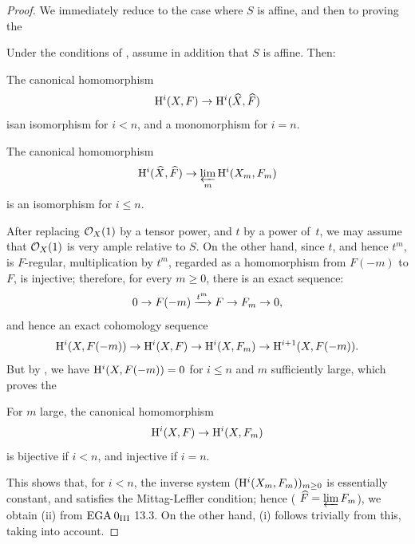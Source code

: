 \begin{proof}
We immediately reduce to the case where $S$ is affine, and then to proving the

\begin{corollaire} \label{XII.2.2}
Under the conditions of , assume in addition that $S$ is affine. Then:
\begin{enumeratei}
\item
The canonical homomorphism
\[
\mathrm H^i(X, F) \to \mathrm H^i(\widehat{X}, \widehat{F})
\]
is\pageoriginale an isomorphism for $i<n$, and a monomorphism for $i=n$.
\item
The canonical homomorphism
\[
\mathrm H^i(\widehat{X}, \widehat{F}) \to \varprojlim_m \mathrm H^i(X_m, F_m)
\]
is an isomorphism for $i\leq n$.
\end{enumeratei}
\end{corollaire}

After replacing $\mathcal O_X(1)$ by a tensor power, and $t$ by a power of~$t$, we may assume that $\mathcal O_X(1)$ is very ample relative to $S$. On the other hand, since $t$, and hence $t^m$, is $F$-regular, multiplication by $t^m$, regarded as a homomorphism from $F(-m)$ to $F$, is injective; therefore, for every $m\geq 0$, there is an exact sequence:
\steco
\begin{equation} \label{eq:XII.14}
0\to F(-m) \xrightarrow{t^m} F \to F_m \to0,
\end{equation}
and hence an exact cohomology sequence
\[
\mathrm H^i(X, F(-m)) \to \mathrm H^i(X, F) \to \mathrm H^i(X, F_m) \to \mathrm H^{i+1}(X, F(-m)).
\]
But by , we have $\mathrm H^i(X, F(-m))=0$ for $i\leq n$ and $m$ sufficiently large, which proves the

\begin{lemme} \label{XII.2.3}
For $m$ large, the canonical homomorphism
\[
\mathrm H^i(X, F) \to \mathrm H^i(X, F_m)
\]
is bijective if $i<n$, and injective if $i=n$.
\end{lemme}

\enlargethispage{-2\baselineskip}%
This shows that, for $i<n$, the inverse system $(\mathrm H^i(X_m, F_m))_{m\geq 0}$ is essentially constant, and \afortiori satisfies the Mittag-Leffler condition; hence ( $\widehat{F}= \varprojlim F_m$), we obtain (ii) from $\textup{EGA}\kern.2em 0_{\textup{III}}$ 13.3. On the other hand, (i) follows trivially from this, taking  into account.


\end{proof}
